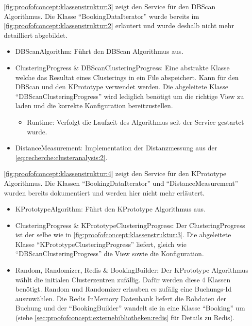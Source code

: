 \cref{fig:proofofconcept:klassenstruktur:3} zeigt den Service für den DBScan Algorithmus. Die Klasse "`BookingDataIterator"' wurde bereits im \cref{fig:proofofconcept:klassenstruktur:2} erläutert und wurde deshalb nicht mehr detailliert abgebildet.
\begin{itemize}
	\item DBScanAlgorithm: Führt den DBScan Algorithmus aus. 
	\item ClusteringProgress \& DBScanClusteringProgress: Eine abstrakte Klasse welche das Resultat eines Clusterings in ein File abspeichert. Kann für den DBScan und den KPrototype verwendet werden. Die abgeleitete Klasse "`DBScanClusteringProgress"' wird lediglich benötigt um die richtige View zu laden und die korrekte Konfiguration bereitzustellen.
	\begin{itemize}
		\item Runtime: Verfolgt die Laufzeit des Algorithmus seit der Service gestartet wurde. 
	\end{itemize}
	\item DistanceMeasurement: Implementation der Distanzmessung aus der \cref{eq:recherche:clusteranalysis:2}.
\end{itemize}

\cref{fig:proofofconcept:klassenstruktur:4} zeigt den Service für den KPrototype Algorithmus. Die Klassen "`BookingDataIterator"' und "`DistanceMeasurement"' wurden bereits dokumentiert und werden hier nicht mehr erläutert.
\begin{itemize}
	\item KPrototypeAlgorithm: Führt den KPrototype Algorithmus aus. 
	\item ClusteringProgress \& KPrototypeClusteringProgress: Der ClusteringProgress ist der selbe wie in \cref{fig:proofofconcept:klassenstruktur:3}. Die abgeleitete Klasse "`KPrototypeClusteringProgress"' liefert, gleich wie "`DBScanClusteringProgress"' die View sowie die Konfiguration. 
	\item Random, Randomizer, Redis \& BookingBuilder: Der KPrototype Algorithmus wählt die initialen Clusterzentren zufällig. Dafür werden diese 4 Klassen benötigt. Random und Randomizer erlauben es zufällg eine Buchungs-Id auszuwählen. Die Redis InMemory Datenbank liefert die Rohdaten der Buchung und der "`BookingBuilder"' wandelt sie in eine Klasse "`Booking"' um (siehe \cref{sec:proofofconcept:externebibliotheken:redis}  für Details zu Redis).
\end{itemize}

